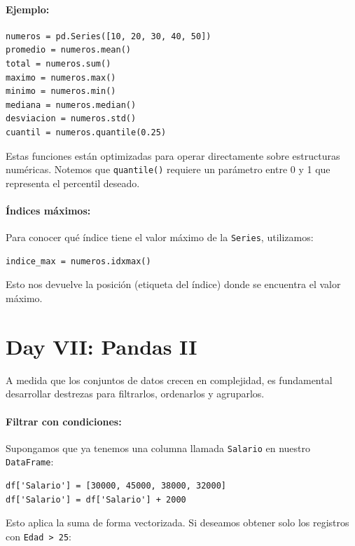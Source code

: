 \documentclass{article}
\theoremstyle{nonumberplain}
\begin{document}
\paragraph{Ejemplo:}

\begin{verbatim}
numeros = pd.Series([10, 20, 30, 40, 50])
promedio = numeros.mean()
total = numeros.sum()
maximo = numeros.max()
minimo = numeros.min()
mediana = numeros.median()
desviacion = numeros.std()
cuantil = numeros.quantile(0.25)
\end{verbatim}

Estas funciones están optimizadas para operar directamente sobre estructuras numéricas. Notemos que \texttt{quantile()} requiere un parámetro entre 0 y 1 que representa el percentil deseado.

\paragraph{Índices máximos:}

Para conocer qué índice tiene el valor máximo de la \texttt{Series}, utilizamos:

\begin{verbatim}
indice_max = numeros.idxmax()
\end{verbatim}

Esto nos devuelve la posición (etiqueta del índice) donde se encuentra el valor máximo.

\section*{Day VII: Pandas II}

A medida que los conjuntos de datos crecen en complejidad, es fundamental desarrollar destrezas para filtrarlos, ordenarlos y agruparlos.

\paragraph{Filtrar con condiciones:}

Supongamos que ya tenemos una columna llamada \texttt{Salario} en nuestro \texttt{DataFrame}:

\begin{verbatim}
df['Salario'] = [30000, 45000, 38000, 32000]
df['Salario'] = df['Salario'] + 2000
\end{verbatim}

Esto aplica la suma de forma vectorizada. Si deseamos obtener solo los registros con \texttt{Edad > 25}:
\end{document}
